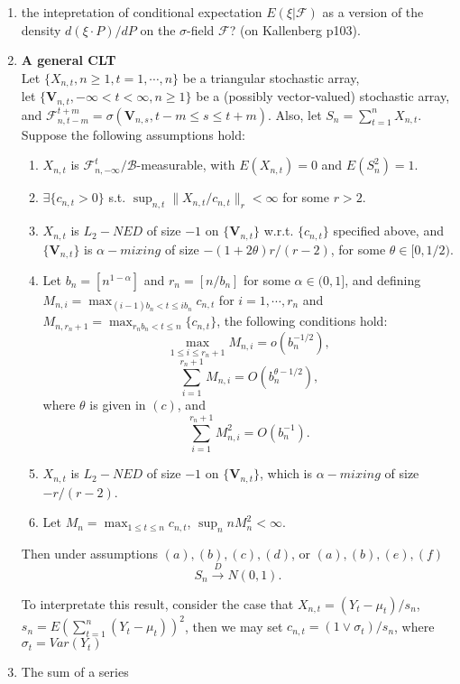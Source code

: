 \documentclass[11pt,a4paper]{article}
\author{Wang Chao}
\begin{document}
\begin{enumerate}
\item the intepretation of conditional expectation $ E(\xi|\mathcal{F}) $ as a version of the density $ d(\xi\cdot P)/dP $ on the $ \sigma $-field $ \mathcal{F} $? (on Kallenberg p103).
\item \textbf{A general CLT}\\
Let $ \{X_{n,t}, n\geq 1,t=1,\cdots,n\} $ be a triangular stochastic array, \\
let $ \{\mathbf{V}_{n,t}, -\infty<t<\infty, n\geq 1\} $ be a (possibly vector-valued) stochastic array,\\
and $ \mathcal{F}_{n,t-m}^{t+m}=\sigma(\mathbf{V}_{n,s},t-m\leq s \leq t+m) $.
Also, let $ S_n=\sum_{t=1}^n X_{n,t} $.
Suppose the following assumptions hold:
\begin{enumerate}
\item $ X_{n,t} $ is $ \mathcal{F}_{n,-\infty}^t/\mathcal{B} $-measurable, with $ E(X_{n,t})=0 $ and $ E(S_n^2)=1 $.
\item $ \exists \{c_{n,t}>0\} $ s.t. $ \sup_{n,t}\|X_{n,t}/c_{n,t}\|_r<\infty $ for some $ r>2 $.
\item $ X_{n,t} $ is $ L_2-NED $ of size $ -1 $ on $ \{\mathbf{V}_{n,t} \} $ w.r.t. $ \{c_{n,t}\} $ specified above, and $ \{\mathbf{V}_{n,t}\} $ is $ \alpha-mixing $ of size $ -(1+2\theta)r/(r-2) $, for some $ \theta\in [0,1/2) $.
\item Let $ b_n=[n^{1-\alpha}] $ and $ r_n=[n/b_n] $ for some $ \alpha\in(0,1] $, and defining $ M_{n,i}=\max_{(i-1)b_n<t\leq i b_n} c_{n,t} $ for $ i=1,\cdots,r_n $ and $ M_{n,r_n+1}=\max_{r_nb_n<t\leq n}\{c_{n,t}\} $, the following conditions hold:
\[\max_{1\leq i\leq r_n+1}M_{n,i}=o(b_n^{-1/2}),\]
\[\sum_{i=1}^{r_n+1}M_{n,i}=O(b_n^{\theta-1/2}),\]
where $ \theta $ is given in $ (c) $, and
\[ \sum_{i=1}^{r_n+1} M_{n,i}^2=O(b_n^{-1}). \]
\item $ X_{n,t} $ is $ L_2-NED $ of size $ -1 $ on $ \{\mathbf{V}_{n,t}\} $, which is $ \alpha-mixing $ of size $ -r/(r-2) $.
\item Let $ M_n=\max_{1\leq t \leq n}c_{n,t} $,  $ \sup_n nM_n^2<\infty $.
\end {enumerate}
Then under assumptions $ (a),(b),(c),(d) $, or $ (a),(b),(e),(f) $
\[ S_n\xrightarrow{D}N(0,1). \]

To interpretate this result, consider the case that $ X_{n,t}=(Y_t-\mu_t)/s_n $, $ s_n=E(\sum_{t=1}^n(Y_t-\mu_t))^2 $, then we may set $ c_{n,t}=(1\vee\sigma_t)/s_n $, where $ \sigma_t=Var(Y_t) $
\item The sum of a series


\end{enumerate}
\end{document}
